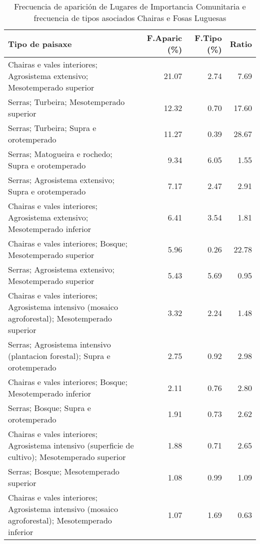 \begin{table}[p]
\centering
\caption{Frecuencia de aparición de Lugares de Importancia Comunitaria e frecuencia de tipos asociados Chairas e Fosas Luguesas} 
\label{vnatura6}
\begin{tabular}{lrrr}
  \hline
Tipo de paisaxe & F.Aparic (\%) & F.Tipo (\%) & Ratio \\ 
  \hline
Chairas e vales interiores; Agrosistema extensivo; Mesotemperado superior & 21.07 & 2.74 & 7.69 \\ 
  Serras; Turbeira; Mesotemperado superior & 12.32 & 0.70 & 17.60 \\ 
  Serras; Turbeira; Supra e orotemperado & 11.27 & 0.39 & 28.67 \\ 
  Serras; Matogueira e rochedo; Supra e orotemperado & 9.34 & 6.05 & 1.55 \\ 
  Serras; Agrosistema extensivo; Supra e orotemperado & 7.17 & 2.47 & 2.91 \\ 
  Chairas e vales interiores; Agrosistema extensivo; Mesotemperado inferior & 6.41 & 3.54 & 1.81 \\ 
  Chairas e vales interiores; Bosque; Mesotemperado superior & 5.96 & 0.26 & 22.78 \\ 
  Serras; Agrosistema extensivo; Mesotemperado superior & 5.43 & 5.69 & 0.95 \\ 
  Chairas e vales interiores; Agrosistema intensivo (mosaico agroforestal); Mesotemperado superior & 3.32 & 2.24 & 1.48 \\ 
  Serras; Agrosistema intensivo (plantacion forestal); Supra e orotemperado & 2.75 & 0.92 & 2.98 \\ 
  Chairas e vales interiores; Bosque; Mesotemperado inferior & 2.11 & 0.76 & 2.80 \\ 
  Serras; Bosque; Supra e orotemperado & 1.91 & 0.73 & 2.62 \\ 
  Chairas e vales interiores; Agrosistema intensivo (superficie de cultivo); Mesotemperado superior & 1.88 & 0.71 & 2.65 \\ 
  Serras; Bosque; Mesotemperado superior & 1.08 & 0.99 & 1.09 \\ 
  Chairas e vales interiores; Agrosistema intensivo (mosaico agroforestal); Mesotemperado inferior & 1.07 & 1.69 & 0.63 \\ 
   \hline
\end{tabular}
\end{table}
